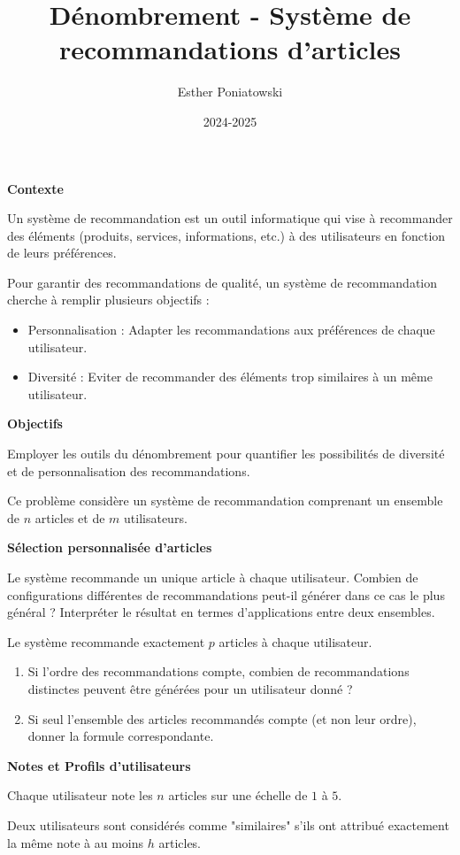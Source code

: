 \documentclass[10pt,a4paper]{article}
\title{Dénombrement - Système de recommandations d'articles}
\author{Esther Poniatowski}
\date{2024-2025}
\begin{document}
\textbf{Contexte}

Un système de recommandation est un outil informatique qui vise à recommander des éléments
(produits, services, informations, etc.) à des utilisateurs en fonction de leurs préférences.

Pour garantir des recommandations de qualité, un système de recommandation cherche à remplir
plusieurs objectifs :
\begin{itemize}
    \item Personnalisation : Adapter les recommandations aux préférences de chaque utilisateur.
    \item Diversité : Eviter de recommander des éléments trop similaires à un même utilisateur.
\end{itemize}
\bigskip

\textbf{Objectifs}

Employer les outils du dénombrement pour quantifier les possibilités de diversité et de
personnalisation des recommandations.

\bigskip
Ce problème considère un système de recommandation comprenant un ensemble de \( n \) articles et de
\( m \) utilisateurs.


\q \textbf{Sélection personnalisée d'articles}

    Le système recommande un unique article à chaque utilisateur. Combien de configurations
    différentes de recommandations peut-il générer dans ce cas le plus général ? Interpréter le
    résultat en termes d'applications entre deux ensembles.

    Le système recommande exactement \( p \) articles à chaque utilisateur.

   \begin{enumerate}
      \item Si l'ordre des recommandations compte, combien de recommandations distinctes peuvent
      être générées pour un utilisateur donné ?
      \item Si seul l'ensemble des articles recommandés compte (et non leur ordre), donner la formule
      correspondante.
    \end{enumerate}


\q \textbf{Notes et Profils d'utilisateurs}

   Chaque utilisateur note les \( n \) articles sur une échelle de \( 1 \) à \( 5 \).

   Deux utilisateurs sont considérés comme "similaires" s'ils ont attribué exactement la même note à
   au moins \( h \) articles.
\end{document}
